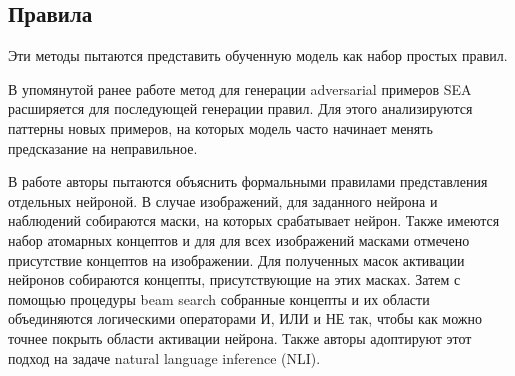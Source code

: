 \vspace{8mm}
\subsection{Правила}

Эти методы пытаются представить обученную модель как набор простых правил.

В упомянутой ранее работе \cite{ribeiroSemanticallyEquivalentAdversarial2018} метод для генерации adversarial примеров SEA расширяется для последующей генерации правил. Для этого анализируются паттерны новых примеров, на которых модель часто начинает менять предсказание на неправильное.

В работе \cite{muCompositionalExplanationsNeurons2021} авторы пытаются объяснить формальными правилами представления отдельных нейроной. В случае изображений, для заданного нейрона и наблюдений собираются маски, на которых срабатывает нейрон. Также имеются набор атомарных концептов и для для всех изображений масками отмечено присутствие концептов на изображении. Для полученных масок активации нейронов собираются концепты, присутствующие на этих масках. Затем с помощью процедуры beam search собранные концепты и их области объединяются логическими операторами И, ИЛИ и НЕ так, чтобы как можно точнее покрыть области активации нейрона. Также авторы адоптируют этот подход  на задаче natural language inference (NLI).


